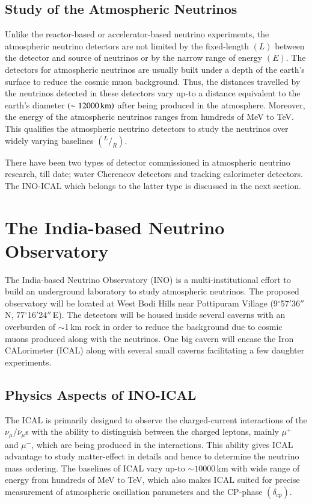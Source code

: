 \subsection{Study of the Atmospheric Neutrinos}
Unlike the reactor-based or accelerator-based neutrino experiments,
the atmospheric neutrino detectors are not limited by the fixed-length
$\left(L\right)$ between the detector and source of neutrinos or by
the narrow range of energy $\left(E\right)$. The detectors for
atmospheric neutrinos are usually built under a depth of the earth's
surface to reduce the cosmic muon background. Thus, the distances
travelled by the neutrinos detected in these detectors vary up-to a
distance equivalent to the earth's diameter
$\left(\sim 12000\text{\,km}\right)$ after being produced in the
atmosphere. Moreover, the energy of the atmospheric neutrinos ranges
from hundreds of MeV to TeV. This qualifies the atmospheric neutrino
detectors to study the neutrinos over widely varying baselines
$\left(^{L}/_{R}\right)$.

There have been two types of detector commissioned in atmospheric
neutrino research, till date; water Cherencov detectors and tracking
calorimeter detectors. The INO-ICAL which belongs to the latter type
is discussed in the next section.

\section{The India-based Neutrino Observatory}
The India-based Neutrino Observatory (INO)\cite{inowhite,inoreport}
is a multi-institutional effort to build an underground laboratory to
study atmospheric neutrinos. The proposed observatory will be located
at West Bodi Hills near Pottipuram Village (9$^\circ$57$'$36$''$\,N,
77$^\circ$16$'$24$''$\,E). The detectors will be housed inside several
caverns with an overburden of $\sim$1\,km rock in order to reduce the
background due to cosmic muons produced along with the neutrinos. One
big cavern will encase the Iron CALorimeter (ICAL) along with several
small caverns facilitating a few daughter experiments.

\subsection{Physics Aspects of INO-ICAL}
The ICAL is primarily designed to observe the charged-current
interactions of the $\nu_{\mu}/\bar{\nu}_{\mu}$s with the ability to
distinguish between the charged leptons, mainly $\mu^{+}$ and $\mu^{-}$,
which are being produced in the interactions. This ability gives ICAL
advantage to study matter-effect in details and hence to determine the
neutrino mass ordering. The baselines of ICAL vary up-to
$\sim 10000$\,km with wide range of energy from hundreds of MeV to
TeV, which also makes ICAL suited for precise measurement of
atmospheric oscillation parameters and the CP-phase
$\left(\delta_{cp}\right)$.


